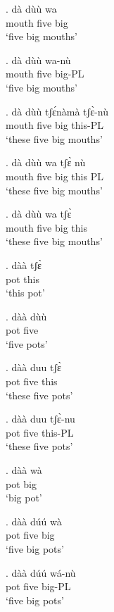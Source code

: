 \documentclass{assets/fieldnotes}
\begin{document}
\exg.
dà      dùù    wa  \\
mouth   five   big \\%
`five big mouths'

\exg.
dà      dùù    wa-nù  \\
mouth   five   big-PL \\%
`five big mouths'

\exg.
dà      dùù    tʃɛ́nàmà   tʃɛ̀-nù  \\
mouth   five   big       this-PL \\%
`these five big mouths'

\exg.
dà      dùù    wa    tʃɛ̀    nù \\
mouth   five   big   this   PL \\%
`these five big mouths'


\exg.
dà      dùù    wa    tʃɛ̀  \\
mouth   five   big   this \\%
`these five big mouths' \label{proximal det}


\exg.
dàà   tʃɛ̀  \\
pot   this \\%
`this pot'

\exg.
dàà   dùù  \\
pot   five \\%
`five pots'

\exg.
dàà   duu    tʃɛ̀  \\
pot   five   this \\%
`these five pots'

\exg.
dàà   duu    tʃɛ̀-nu  \\
pot   five   this-PL \\%
`these five pots'

\exg.
dàà   wà  \\
pot   big \\%
`big pot'

\exg.
dàà   dúú    wà  \\
pot   five   big \\%
`five big pots'

\exg.
dàà   dúú    wá-nù  \\
pot   five   big-PL \\%
`five big pots'
\end{document}
